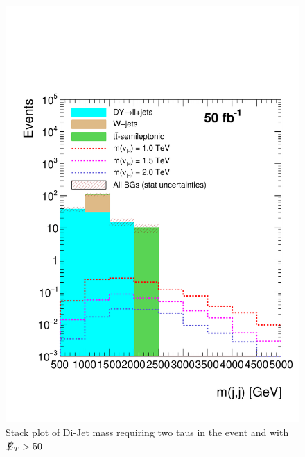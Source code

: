 \begin{figure}
\centering
\includegraphics[width=\linewidth]{StackPlots/mjj_2taus_met50_50ifb.pdf}
\caption{Stack plot of Di-Jet mass requiring two taus in the event and with $\slashed{E}_{T} > 50$}
\label{fig: mjj2tauMet50}
\end{figure}

